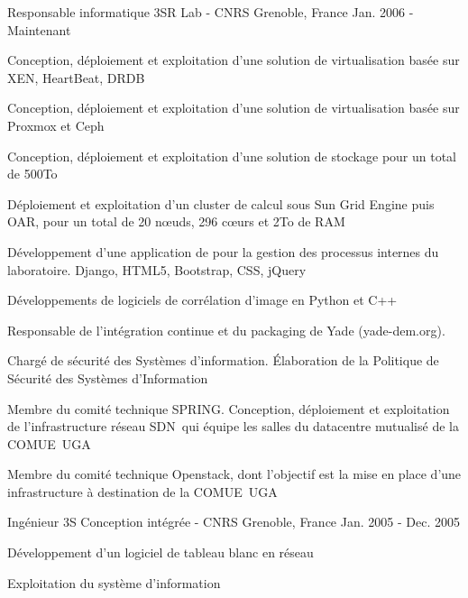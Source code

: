 

\begin{cventries}

  \cventry
    {Responsable informatique} %
    {3SR Lab - CNRS} %
    {Grenoble, France} %
    {Jan. 2006 - Maintenant} %
    {
      \begin{cvitems} %
        \item {Conception, déploiement et exploitation d'une solution de virtualisation basée sur XEN, HeartBeat, DRDB}
        \item {Conception, déploiement et exploitation d'une solution de virtualisation basée sur Proxmox et Ceph}
        \item {Conception, déploiement et exploitation d'une solution de stockage pour un total de 500To}
        \item {Déploiement et exploitation d'un cluster de calcul sous Sun Grid Engine puis OAR, pour un total de 20 nœuds, 296 cœurs et 2To de RAM}
        \item {Développement d'une application de pour la gestion des processus internes du laboratoire. Django, HTML5, Bootstrap, CSS, jQuery}
        \item {Développements de logiciels de corrélation d'image en Python et C++}
        \item {Responsable de l'intégration continue et du packaging de Yade (yade-dem.org).}
        \item {Chargé de sécurité des Systèmes d'information. Élaboration de la Politique de Sécurité des Systèmes d'Information}
        \item {Membre du comité technique SPRING. Conception, déploiement et exploitation de l'infrastructure réseau SDN qui équipe les salles du datacentre mutualisé de la COMUE UGA}
        \item {Membre du comité technique Openstack, dont l'objectif est la mise en place d'une infrastructure à destination de la COMUE UGA}
      \end{cvitems}
    }

  \cventry
    {Ingénieur} %
    {3S Conception intégrée - CNRS} %
    {Grenoble, France} %
    {Jan. 2005 - Dec. 2005} %
    {
      \begin{cvitems} %
        \item {Développement d'un logiciel de tableau blanc en réseau}
        \item {Exploitation du système d'information}
      \end{cvitems}
    }

\end{cventries}

